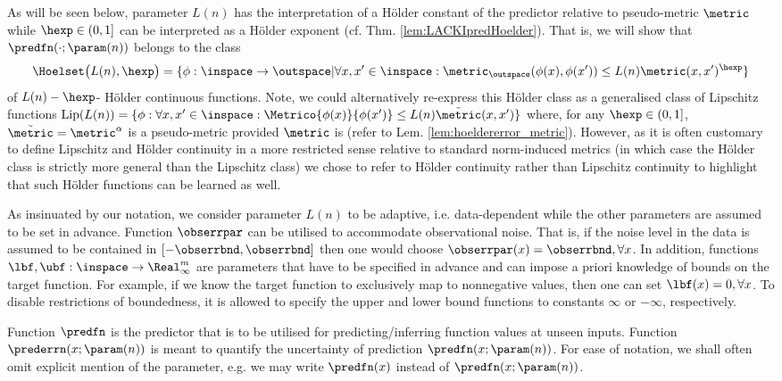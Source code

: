 \begin{defn}
  As will be seen below,  parameter $L(n)$ has the interpretation of a H\"older constant of the predictor relative to pseudo-metric $\metric$ while $\hexp \in (0,1]$ can be interpreted as a H\"older exponent (cf. Thm. \ref{lem:LACKIpredHoelder}). That is, we will show that $\predfn(\cdot;\param(n))$ belongs to the class $$\Hoelset \bigl(L(n),\hexp\bigr) = \{ \phi: \inspace \to \outspace | \forall x,x' \in \inspace : \metric_\outspace(\phi(x),\phi(x') ) \leq L(n) \metric(x,x')^\hexp\}$$ of $L(n)-\hexp$- H\"older continuous functions. Note, we could alternatively re-express this H\"older class as a generalised class of Lipschitz functions $\text{Lip}(L(n))= \{ \phi: \forall x,x' \in \inspace: \Metrico{\phi(x)}{\phi(x')} \leq L(n) \tilde \metric (x,x')\} $ where, for any $\hexp \in (0,1]$, $\tilde \metric = \metric^\alpha$ is a pseudo-metric provided  $\metric$ is (refer to Lem. \ref{lem:hoeldererror_metric}). However, as it is often customary to define Lipschitz and H\"older continuity in a more restricted sense relative to standard norm-induced metrics (in which case the H\"older class is strictly more general than the Lipschitz class) we chose to refer to H\"older continuity rather than Lipschitz continuity to highlight that such H\"older functions can be learned as well.
  
  As insinuated by our notation, we consider parameter $L(n)$ to be adaptive, i.e.  data-dependent while the other parameters are assumed to be set in advance.
 Function $\obserrpar$ can be utilised to accommodate observational noise. 
That is, if the noise level in the data is assumed to be contained in $[-\obserrbnd, \obserrbnd]$ then one would choose $\obserrpar(x) = \obserrbnd,\forall x$.
In addition,  functions $\lbf,\ubf:  \inspace \to \Real_\infty^m$ are parameters that have to be specified in advance and can impose a priori knowledge of bounds on the target function. For example, if we know the target function to exclusively map to nonnegative values, then one can set $\lbf(x) = 0,\forall x$.
To disable restrictions of boundedness, it is allowed to specify the upper and lower bound functions to constants $\infty$ or $-\infty$, respectively.	

  
Function $\predfn$ is the predictor that is to be utilised for predicting/inferring function values at unseen inputs. Function $\prederrn(x;\param(n))$ is meant to quantify the uncertainty of prediction $\predfn(x;\param(n))$. 
For ease of notation, we shall often omit explicit mention of the parameter, e.g. we may write $\predfn(x)$ instead of $\predfn(x;\param(n))$.
\end{defn}



